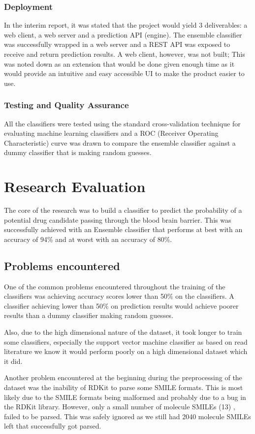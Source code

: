 \documentclass[a4paper,12pt]{article}
\begin{document}
		\subsubsection{Deployment}
		In the interim report, it was stated that the project would yield 3 deliverables: a web client, a web server and a prediction API (engine). The ensemble classifier was successfully wrapped in a web server and a REST API was exposed to receive and return prediction results. A web client, however, was not built; This was noted down as an extension that would be done given enough time as it would provide an intuitive and easy accessible UI to make the product easier to use.
		\subsubsection{Testing and Quality Assurance}
		All the classifiers were tested using the standard cross-validation technique for evaluating machine learning classifiers and a ROC (Receiver Operating Characteristic) curve was drawn to compare the ensemble classifier against a dummy classifier that is making random guesses.
	

\section{Research Evaluation}
	The core of the research was to build a classifier to predict the probability of a potential drug candidate passing through the blood brain barrier. This was successfully achieved with an Ensemble classifier that performs at best with an accuracy of 94\% and at worst with an accuracy of 80\%.
	
	\subsection{Problems encountered}
	One of the common problems encountered throughout the training of the classifiers was achieving accuracy scores lower than 50\% on the classifiers. A classifier achieving lower than 50\% on prediction results would achieve poorer results than a dummy classifier making random guesses. 
	
	Also, due to the high dimensional nature of the dataset, it took longer to train some classifiers, especially the support vector machine classifier as based on read literature we know it would perform poorly on a high dimensional dataset which it did.
	
	Another problem encountered at the beginning during the preprocessing of the dataset was the inability of RDKit to parse some SMILE formats. This is most likely due to the SMILE formats being malformed and probably due to a bug in the RDKit library. However, only a small number of molecule SMILEs (13) , failed to be parsed. This was safely ignored as we still had 2040 molecule SMILEs left that successfully got parsed.
	
\end{document}
